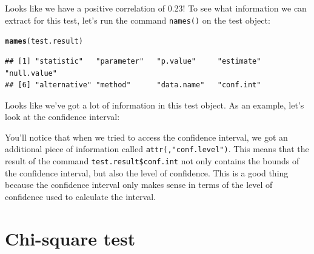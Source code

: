 \documentclass{tufte-book}\usepackage[]{graphicx}\usepackage[]{color}
\makeatletter
\newcommand{\hlopt}[1]{\textcolor[rgb]{0,0,0}{#1}}%
\newcommand{\hlstd}[1]{\textcolor[rgb]{0.345,0.345,0.345}{#1}}%
\newcommand{\hlkwd}[1]{\textcolor[rgb]{0.737,0.353,0.396}{\textbf{#1}}}%
\newenvironment{kframe}{%
 \def\at@end@of@kframe{}%
 \ifinner\ifhmode%
  \def\at@end@of@kframe{\end{minipage}}%
  \begin{minipage}{\columnwidth}%
 \fi\fi%
 \def\FrameCommand##1{\hskip\@totalleftmargin \hskip-\fboxsep
 \colorbox{shadecolor}{##1}\hskip-\fboxsep
     \hskip-\linewidth \hskip-\@totalleftmargin \hskip\columnwidth}%
 \MakeFramed {\advance\hsize-\width
   \@totalleftmargin\z@ \linewidth\hsize
   \@setminipage}}%
 {\par\unskip\endMakeFramed%
 \at@end@of@kframe}
\newenvironment{knitrout}{}{} %
\makeatother
\begin{document}
Looks like we have a positive correlation of 0.23! To see what information we can extract for this test, let's run the command \texttt{names()} on the test object:

\begin{footnotesize}
\begin{knitrout}
\color{fgcolor}\begin{kframe}
\begin{alltt}
\hlkwd{names}\hlstd{(test.result)}
\end{alltt}
\begin{verbatim}
## [1] "statistic"   "parameter"   "p.value"     "estimate"    "null.value" 
## [6] "alternative" "method"      "data.name"   "conf.int"
\end{verbatim}
\end{kframe}
\end{knitrout}
\end{footnotesize}

Looks like we've got a lot of information in this test object. As an example, let's look at the confidence interval:


You'll notice that when we tried to access the confidence interval, we got an additional piece of information called \texttt{attr(,"conf.level")}. This means that the result of the command \texttt{test.result\$conf.int} not only contains the bounds of the confidence interval, but also the level of confidence. This is a good thing because the confidence interval only makes sense in terms of the level of confidence used to calculate the interval.

\section{Chi-square test}
\end{document}
